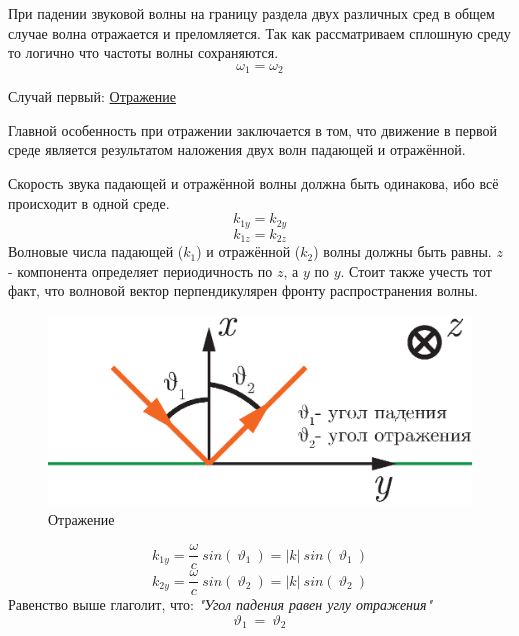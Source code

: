 \documentclass[14pt,a4paper,oneside]{extarticle}	%
\begin{document}
При падении звуковой волны на границу раздела двух различных сред в общем случае волна отражается и преломляется.
Так как рассматриваем сплошную среду  то логично что частоты волны сохраняются.
\begin{equation*}
\boxed{\omega_{1} = \omega_{2}} 
\end{equation*}

Случай первый: \underline{Отражение}

Главной особенность при отражении заключается в том, что движение в первой среде является результатом наложения двух волн падающей и отражённой.

Скорость звука падающей и отражённой волны должна быть одинакова, ибо всё происходит в одной среде.
\begin{equation*}
k_{1y} =k_{2y} 
\end{equation*}
\begin{equation*}
k_{1z} =k_{2z} 
\end{equation*}
 Волновые числа падающей ($ k_{1} $) и отражённой ($ k_{2} $) волны должны быть равны. $ z $ - компонента определяет периодичность по $ z $, а $ y $ по  $ y $.
 Стоит также учесть тот факт, что волновой вектор перпендикулярен фронту распространения волны.

\begin{figure}[h!] 	%
	\centering 		%
	\includegraphics[width=12cm]{4.eps} %
	\caption{Отражение}
	\label{fig::4}
\end{figure}

\begin{equation*}
k_{1y} = \frac{\omega}{c}\: sin(\: \vartheta_{1}\:) =  |k|\: sin(\: \vartheta_{1}\:)
\end{equation*}
\begin{equation*}
k_{2y} = \frac{\omega}{c}\: sin(\: \vartheta_{2}\:) =  |k|\: sin(\: \vartheta_{2}\:)
\end{equation*}
Равенство выше глаголит, что: \textit{"Угол падения равен углу отражения"}
\begin{equation*}
\: \vartheta_{1}\: =  \: \vartheta_{2}\:
\end{equation*}
\end{document}
